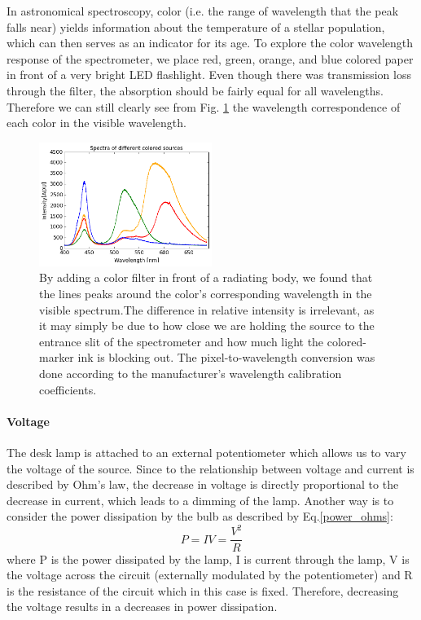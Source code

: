 \documentclass[authoryear, 12pt,5p, times]{elsarticle}
\begin{document}
	 In astronomical spectroscopy, color (i.e. the range of wavelength that the peak falls near) yields information about the temperature of a stellar population, which can then serves as an indicator for its age. To explore the color wavelength response of the spectrometer, we place red, green, orange, and blue colored paper in front of a very bright LED flashlight. Even though there was transmission loss through the filter, the absorption should be fairly equal for all wavelengths. Therefore we can still clearly see from  Fig. \ref{color} the wavelength correspondence of each color  in the visible wavelength. 
	\begin{figure}[h!]
\includegraphics[width=0.5\textwidth]{figures/color}
\caption{ By adding a color filter in front of a radiating body, we found that the lines peaks around the color's corresponding wavelength in the visible spectrum.The difference in relative intensity is irrelevant, as it may simply be due to how close we are holding the source to the entrance slit of the spectrometer and how much light the colored-marker ink is blocking out. The pixel-to-wavelength conversion was done according to the manufacturer's wavelength calibration coefficients.}
\label{color}
\end{figure}
	\paragraph*{\textbf{Voltage}} The desk lamp is attached to an external potentiometer which allows us to vary the voltage of the source. Since to the relationship between voltage and current is described by Ohm's law, the decrease in voltage is directly proportional to the decrease in current, which  leads to a dimming of the lamp. Another way is to consider the power dissipation by the bulb as described by Eq.\ref{power_ohms}:
	\begin{equation}
	P=IV=\frac{V^2}{R}
	\label{power_ohms}
	\end{equation}
		where P is the power dissipated by the lamp, I is current through the lamp, V is the voltage across the circuit (externally modulated by the potentiometer) and R is the resistance of the circuit which in this case is fixed. Therefore, decreasing the voltage results in a decreases in power dissipation.
		
\end{document}
